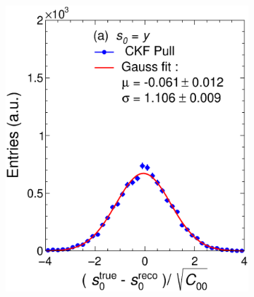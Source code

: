 \begin{figure}[t]
     \centering
     \begin{subfigure}{0.32\textwidth}
         \centering
         \includegraphics[width=\textwidth]{figures/ch5-KF_NDGAr/FullSample/Int/Units/IdealUnit0.eps}
         \caption{}
         \label{fig:resp0KFGAr_IntI}
     \end{subfigure}
     \begin{subfigure}{0.32\textwidth}
         \centering

\end{subfigure}
\end{figure}
